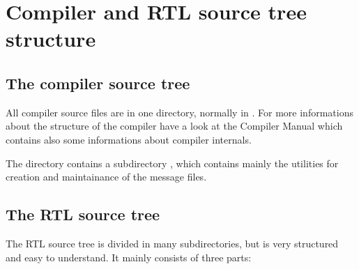 
\chapter{Compiler and RTL source tree structure}
\label{ch:AppB}

\section{The compiler source tree}

All compiler source files are in one directory, normally in
. For more informations
about the structure of the compiler have a look at the
Compiler Manual which contains also some informations about
compiler internals.

The  directory contains a subdirectory ,
which contains mainly the utilities for creation and maintainance of the
message files.

\section{The RTL source tree}
The RTL source tree is divided in many subdirectories, but is very
structured and easy to understand. It mainly consists of three parts:

